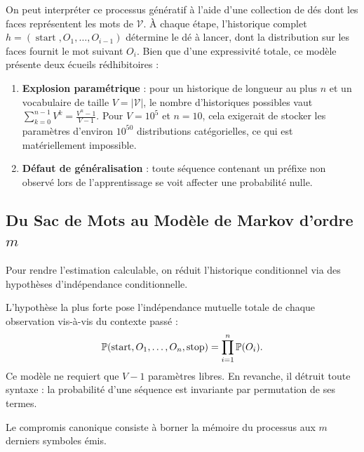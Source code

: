 \begin{remark}
    On peut interpréter ce processus génératif à l'aide d'une collection de dés dont les faces représentent les mots de $\mathcal{V}$. À chaque étape, l'historique complet $h = (\operatorname{start}, O_1, \dots, O_{i-1})$ détermine le dé à lancer, dont la distribution sur les faces fournit le mot suivant $O_i$. 
    Bien que d'une expressivité totale, ce modèle présente deux écueils rédhibitoires :
    \begin{enumerate}
        \item \textbf{Explosion paramétrique} : pour un historique de longueur au plus $n$ et un vocabulaire de taille $V = |\mathcal{V}|$, le nombre d'historiques possibles vaut $\sum_{k=0}^{n-1} V^k = \frac{V^n - 1}{V - 1}$. Pour $V = 10^5$ et $n = 10$, cela exigerait de stocker les paramètres d'environ $10^{50}$ distributions catégorielles, ce qui est matériellement impossible.
        \item \textbf{Défaut de généralisation} : toute séquence contenant un préfixe non observé lors de l'apprentissage se voit affecter une probabilité nulle.
    \end{enumerate}
\end{remark}

\subsection{Du Sac de Mots au Modèle de Markov d'ordre $m$}

Pour rendre l'estimation calculable, on réduit l'historique conditionnel via des hypothèses d'indépendance conditionnelle.

\begin{definition}
    L'hypothèse la plus forte pose l'indépendance mutuelle totale de chaque observation vis-à-vis du contexte passé :
    \begin{equation}
        \mathbb{P}(\operatorname{start}, O_1, \dots, O_n, \operatorname{stop}) = \prod_{i=1}^{n} \mathbb{P}(O_i).
    \end{equation}
    Ce modèle ne requiert que $V - 1$ paramètres libres. En revanche, il détruit toute syntaxe : la probabilité d'une séquence est invariante par permutation de ses termes.
\end{definition}

Le compromis canonique consiste à borner la mémoire du processus aux $m$ derniers symboles émis.

